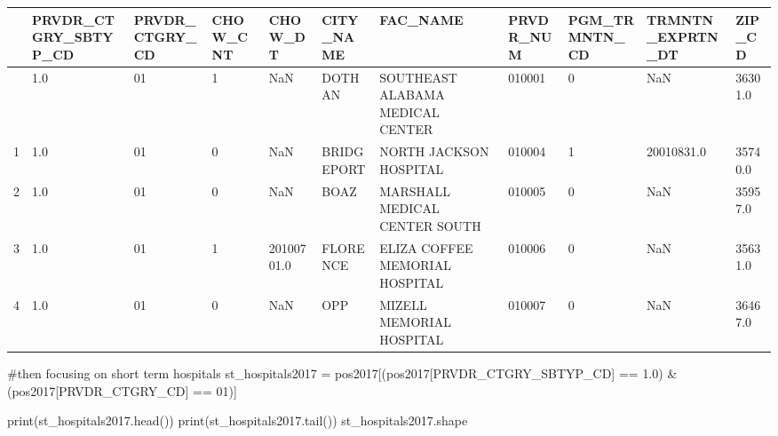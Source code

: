 \documentclass[
  letterpaper,
  DIV=11,
  numbers=noendperiod]{scrartcl}
\newenvironment{Shaded}{\begin{snugshade}}{\end{snugshade}}
\newcommand{\BuiltInTok}[1]{\textcolor[rgb]{0.00,0.23,0.31}{#1}}
\newcommand{\CommentTok}[1]{\textcolor[rgb]{0.37,0.37,0.37}{#1}}
\newcommand{\NormalTok}[1]{\textcolor[rgb]{0.00,0.23,0.31}{#1}}
\newcommand{\OperatorTok}[1]{\textcolor[rgb]{0.37,0.37,0.37}{#1}}
\newcommand{\StringTok}[1]{\textcolor[rgb]{0.13,0.47,0.30}{#1}}
\begin{document}
\begin{longtable}[]{@{}lllllllllll@{}}
\toprule\noalign{}
& PRVDR\_CTGRY\_SBTYP\_CD & PRVDR\_CTGRY\_CD & CHOW\_CNT & CHOW\_DT &
CITY\_NAME & FAC\_NAME & PRVDR\_NUM & PGM\_TRMNTN\_CD &
TRMNTN\_EXPRTN\_DT & ZIP\_CD \\
\midrule\noalign{}
\endhead
\bottomrule\noalign{}
\endlastfoot
0 & 1.0 & 01 & 1 & NaN & DOTHAN & SOUTHEAST ALABAMA MEDICAL CENTER &
010001 & 0 & NaN & 36301.0 \\
1 & 1.0 & 01 & 0 & NaN & BRIDGEPORT & NORTH JACKSON HOSPITAL & 010004 &
1 & 20010831.0 & 35740.0 \\
2 & 1.0 & 01 & 0 & NaN & BOAZ & MARSHALL MEDICAL CENTER SOUTH & 010005 &
0 & NaN & 35957.0 \\
3 & 1.0 & 01 & 1 & 20100701.0 & FLORENCE & ELIZA COFFEE MEMORIAL
HOSPITAL & 010006 & 0 & NaN & 35631.0 \\
4 & 1.0 & 01 & 0 & NaN & OPP & MIZELL MEMORIAL HOSPITAL & 010007 & 0 &
NaN & 36467.0 \\
\end{longtable}

\begin{Shaded}
\begin{Highlighting}[]
\CommentTok{\#then focusing on short term hospitals }
\NormalTok{st\_hospitals2017 }\OperatorTok{=}\NormalTok{ pos2017[(pos2017[}\StringTok{\textquotesingle{}PRVDR\_CTGRY\_SBTYP\_CD\textquotesingle{}}\NormalTok{] }\OperatorTok{==} \StringTok{\textquotesingle{}1.0\textquotesingle{}}\NormalTok{) }\OperatorTok{\&}\NormalTok{ (pos2017[}\StringTok{\textquotesingle{}PRVDR\_CTGRY\_CD\textquotesingle{}}\NormalTok{] }\OperatorTok{==} \StringTok{\textquotesingle{}01\textquotesingle{}}\NormalTok{)]}

\BuiltInTok{print}\NormalTok{(st\_hospitals2017.head())}
\BuiltInTok{print}\NormalTok{(st\_hospitals2017.tail())}
\NormalTok{st\_hospitals2017.shape}
\end{Highlighting}
\end{Shaded}
\end{document}
